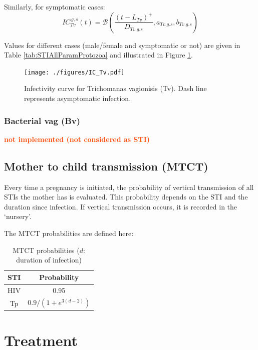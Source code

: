 \documentclass[11pt, onecolumn]{article}
\newcommand{\warning}[1]{\textbf{\textcolor{OrangeRed}{#1}}}
\begin{document}
Similarly, for symptomatic cases:
$$IC_{Tv}^{\,g,s}(t) = \mathcal{B}\left(\frac{(t-L_{Tv})^+}{D_{Tv.g.s}},a_{Tv.g.s},b_{Tv.g.s}\right)  $$

Values for different cases (male/female and symptomatic or not) are given in Table \ref{tab:STIAllParamProtozoa} and illustrated in Figure \ref{fig:ICTv}.

\begin{figure}[!ht]
\centering
   \texttt{[image: ./figures/IC\_Tv.pdf]}
\caption{Infectivity curve for Trichomanas vagionisis (Tv). Dash line represents asymptomatic infection.}
\label{fig:ICTv}
\end{figure}


\subsubsection{Bacterial vag (Bv)}
\warning{not implemented (not considered as STI)}

\subsection{Mother to child transmission (MTCT)}

Every time a pregnancy is initiated, the probability of vertical transmission of all STIs the mother has is evaluated. This probability depends on the STI and the duration since infection. If vertical transmission occurs, it is recorded in the `nursery'.

The MTCT probabilities are defined here:

\begin{table}[htdp]
\caption{MTCT probabilities ($d$: duration of infection)}
\begin{center}
\begin{tabular}{|c|c|}
\hline
STI & Probability \\
\hline
HIV & 0.95 \\
Tp & $0.9/\left(1+e^{3(d-2)}\right)$  \\
\hline
\end{tabular}
\end{center}
\label{default}
\end{table}%




\section{Treatment}
\end{document}
